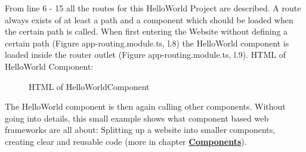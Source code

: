From line 6 - 15 all the routes for this HelloWorld Project are described.
A route always exists of at least a path and a component which should be loaded when the certain path is called.
When first entering the Website without defining a certain path (Figure app-routing.module.ts, l.8) the HelloWorld
component is loaded inside the router outlet (Figure app-routing.module.ts, l.9).
HTML of HelloWorld Component:

\begin{figure}[H]
    \centering
    \caption{HTML of HelloWorldComponent}
    \label{fig:htmlhello}
\end{figure}

The HelloWorld component is then again calling other components.
Without going into details, this small example shows what component based web frameworks are all about: Splitting up a
website into smaller components, creating clear and reusable code
(more in chapter \hyperref[subsec:components]{\textbf{Components}}).

